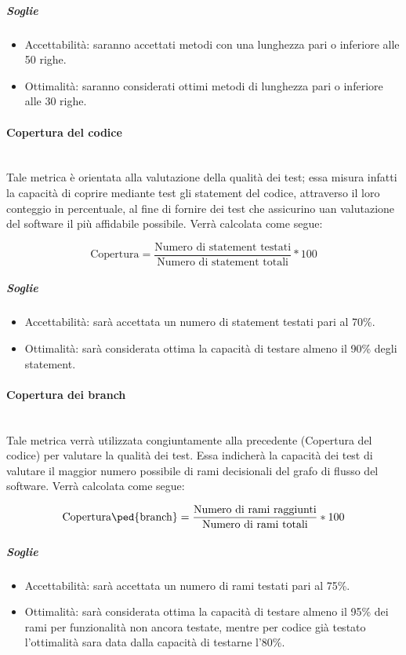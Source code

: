 \subparagraph{Soglie}
	\begin{itemize}
	\item Accettabilità: saranno accettati metodi con una lunghezza pari o inferiore alle  50 righe.
	\item Ottimalità: saranno considerati ottimi metodi di lunghezza pari o inferiore alle 30 righe.
	\end{itemize}

\paragraph{Copertura del codice}
	~\\Tale metrica è orientata alla valutazione della qualità dei test; essa misura infatti la capacità di coprire mediante test gli statement del codice, attraverso il loro conteggio in percentuale, al fine di fornire dei test che assicurino uan valutazione del software il più affidabile possibile. Verrà calcolata come segue:

	\begin{displaymath}
		\mbox{Copertura} =\frac{\mbox{Numero di statement testati}}{\mbox{Numero di statement totali}} * 100
	\end{displaymath}	
	
\subparagraph{Soglie}
	\begin{itemize}
	\item Accettabilità: sarà accettata un numero di statement testati pari al 70\%.
	\item Ottimalità: sarà considerata ottima la capacità di testare almeno il 90\% degli statement.
	\end{itemize}
	

\paragraph{Copertura dei branch}
	~\\Tale metrica verrà utilizzata congiuntamente alla precedente (Copertura del codice) per valutare la qualità dei test. Essa indicherà la capacità dei test di valutare il maggior numero possibile di rami decisionali del grafo di flusso del software. Verrà calcolata come segue:

	\begin{displaymath}
		\mbox{Copertura\ped{branch}} =\frac{\mbox{Numero di rami raggiunti}}{\mbox{Numero di rami totali}} * 100
	\end{displaymath}	
	
	\subparagraph{Soglie}
	\begin{itemize}
	\item Accettabilità: sarà accettata un numero di rami testati pari al 75\%.
	\item Ottimalità: sarà considerata ottima la capacità di testare almeno il 95\% dei rami per funzionalità non ancora testate, mentre per codice già testato l'ottimalità sara data dalla capacità di testarne l'80\%.
	\end{itemize}
